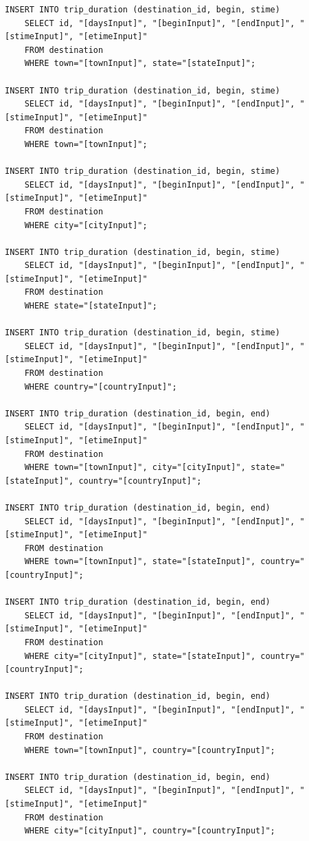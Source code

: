 \documentclass[letterpaper,10pt,onecolumn,compsoc]{IEEEtran}
\begin{document}
\begin{verbatim}	
INSERT INTO trip_duration (destination_id, begin, stime) 
	SELECT id, "[daysInput]", "[beginInput]", "[endInput]", "[stimeInput]", "[etimeInput]" 
	FROM destination 
	WHERE town="[townInput]", state="[stateInput]";
	
INSERT INTO trip_duration (destination_id, begin, stime) 
	SELECT id, "[daysInput]", "[beginInput]", "[endInput]", "[stimeInput]", "[etimeInput]" 
	FROM destination 
	WHERE town="[townInput]";
	
INSERT INTO trip_duration (destination_id, begin, stime) 
	SELECT id, "[daysInput]", "[beginInput]", "[endInput]", "[stimeInput]", "[etimeInput]" 
	FROM destination 
	WHERE city="[cityInput]";
	
INSERT INTO trip_duration (destination_id, begin, stime) 
	SELECT id, "[daysInput]", "[beginInput]", "[endInput]", "[stimeInput]", "[etimeInput]" 
	FROM destination 
	WHERE state="[stateInput]";
	
INSERT INTO trip_duration (destination_id, begin, stime) 
	SELECT id, "[daysInput]", "[beginInput]", "[endInput]", "[stimeInput]", "[etimeInput]" 
	FROM destination 
	WHERE country="[countryInput]";
	
INSERT INTO trip_duration (destination_id, begin, end) 
	SELECT id, "[daysInput]", "[beginInput]", "[endInput]", "[stimeInput]", "[etimeInput]" 
	FROM destination 
	WHERE town="[townInput]", city="[cityInput]", state="[stateInput]", country="[countryInput]";
	
INSERT INTO trip_duration (destination_id, begin, end) 
	SELECT id, "[daysInput]", "[beginInput]", "[endInput]", "[stimeInput]", "[etimeInput]" 
	FROM destination 
	WHERE town="[townInput]", state="[stateInput]", country="[countryInput]";
	
INSERT INTO trip_duration (destination_id, begin, end) 
	SELECT id, "[daysInput]", "[beginInput]", "[endInput]", "[stimeInput]", "[etimeInput]" 
	FROM destination 
	WHERE city="[cityInput]", state="[stateInput]", country="[countryInput]";
	
INSERT INTO trip_duration (destination_id, begin, end) 
	SELECT id, "[daysInput]", "[beginInput]", "[endInput]", "[stimeInput]", "[etimeInput]" 
	FROM destination 
	WHERE town="[townInput]", country="[countryInput]";
	
INSERT INTO trip_duration (destination_id, begin, end) 
	SELECT id, "[daysInput]", "[beginInput]", "[endInput]", "[stimeInput]", "[etimeInput]" 
	FROM destination 
	WHERE city="[cityInput]", country="[countryInput]";
	

\end{verbatim}
\end{document}
